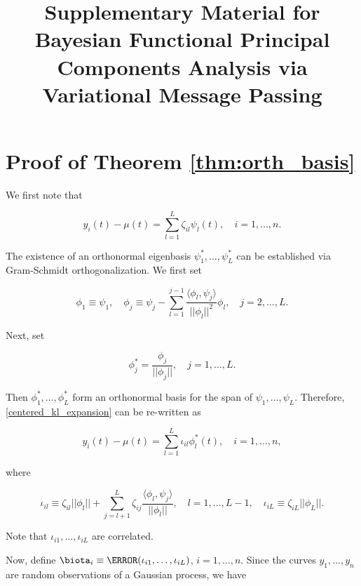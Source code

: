 \documentclass[12pt]{article}
\title{Supplementary Material for Bayesian Functional Principal Components Analysis via Variational Message Passing}
\author{}
\theoremstyle{plain}
\theoremstyle{definition}
\theoremstyle{remark}
\begin{document}
\maketitle


\appendix
{}


\section{Proof of Theorem \ref{thm:orth_basis}}
\label{app:proof_thm_orth_basis}

We first note that

\begin{equation}
	y_i (t) - \mu (t) = \sum_{l=1}^L \zeta_{il} \psi_l (t), \quad i = 1, \dots, n.
\label{centered_kl_expansion}
\end{equation}

\noindent The existence of an orthonormal eigenbasis $\psi^*_1, \dots, \psi^*_L$ can be established via Gram-Schmidt
orthogonalization. We first set

\[
	\phi_1 \equiv \psi_1, \quad
	\phi_j \equiv \psi_j - \sum_{l=1}^{j-1} \frac{\langle \phi_l, \psi_j \rangle}{|| \phi_l ||^2} \phi_l, \quad j = 2, \dots, L.
\]

\noindent Next, set

\[
	\phi^*_j = \frac{\phi_j}{|| \phi_j ||}, \quad j = 1, \dots, L.
\]

\noindent Then $\phi^*_1, \dots, \phi^*_L$ form an orthonormal basis for the span of $\psi_1, \dots, \psi_L$. Therefore,
\eqref{centered_kl_expansion} can be re-written as

\[
	y_i (t) - \mu (t) = \sum_{l=1}^L \iota_{il} \phi^*_l (t), \quad i = 1, \dots, n,
\]

\noindent where

\[
	\iota_{il} \equiv \zeta_{il} ||\phi_l|| + \sum_{j=l+1}^L \zeta_{ij} \frac{\langle \phi_l , \psi_j \rangle}{||\phi_l||}, \quad
	l = 1, \dots, L-1, \quad
	\iota_{iL} \equiv \zeta_{iL} ||\phi_L||.
\]

\noindent Note that $\iota_{i1}, \dots, \iota_{iL}$ are correlated.

Now, define $\biota_i \equiv \T{(\iota_{i1}, \dots, \iota_{iL})}$, $i = 1, \dots, n$. Since the curves $y_1, \dots, y_n$ are
random observations of a Gaussian process, we have
\end{document}
